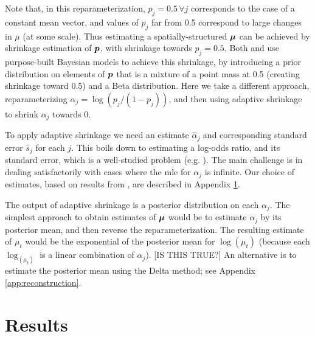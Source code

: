 \documentclass[12pt]{article}
\begin{document}
Note that, in this reparameterization, $p_j=0.5 \, \forall j$ corresponds to the case of a constant mean vector,
and values of $p_j$ far from 0.5 correspond to large changes in $\mu$ (at some scale).
Thus estimating a spatially-structured $\bm{\mu}$ can be achieved by shrinkage estimation of $\bm{p}$, with shrinkage towards $p_j=0.5$. Both \cite{Nowak2000Statistical} and \cite{Timmermann1999Multiscale} use purpose-built Bayesian models to
achieve this shrinkage, by introducing a prior distribution on elements of $\bm{p}$ that is
a mixture of a point mass at 0.5 (creating shrinkage toward 0.5) 
and a Beta distribution. Here we take a different approach, reparameterizing $\alpha_j = \log(p_j/(1-p_j))$,
and then using adaptive shrinkage to shrink $\alpha_j$ towards 0. 

To apply adaptive shrinkage we need an estimate $\hat{\alpha}_{j}$ and corresponding standard error $\hat{s}_j$
for each $j$. This boils down to estimating a log-odds ratio, and its standard error, which is a well-studied problem
(e.g. \cite{Gart1967Bias}). The main challenge is in dealing satisfactorily with cases where the mle for $\alpha_j$ is infinite. Our choice of estimates, based on results from \cite{Gart1967Bias}, are described in Appendix \ref{}.

The output of adaptive shrinkage is a posterior distribution on each $\alpha_j$. The simplest approach
to obtain estimates of $\bm{\mu}$  would be to estimate
$\alpha_j$ by its posterior mean, and then reverse the reparameterization. 
The resulting estimate of $\mu_t$ would be the exponential of the posterior
mean for $\log(\mu_t)$ (because each $\log_(\mu_t)$ is a linear combination of $\alpha_j$). [IS THIS TRUE?]
An alternative is to estimate the posterior mean using the Delta method; see Appendix \ref{app:reconstruction}.




 





\section{Results}
\end{document}
